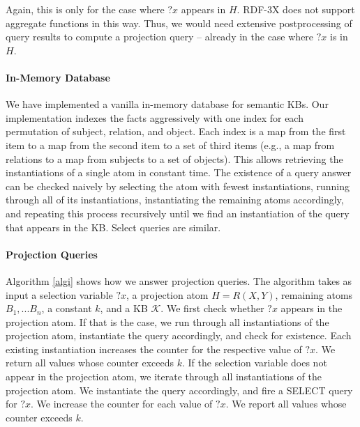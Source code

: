 Again, this is only for the case where $?x$ appears in $H$. RDF-3X does not support aggregate functions in this way. Thus, we would need extensive postprocessing of query results to compute a projection query -- already in the case where $?x$ is in $H$.

\paragraph{In-Memory Database} We have implemented a vanilla in-memory database for semantic KBs. Our implementation indexes the facts aggressively with one index for each permutation of subject, relation, and object. Each index is a map from the first item to a map from the second item to a set of third items (e.g., a map from relations to a map from subjects to a set of objects). This allows retrieving the instantiations of a single atom in constant time. The existence of a query answer can be checked naively by selecting the atom with fewest instantiations, running through all of its instantiations, instantiating the remaining atoms accordingly, and repeating this process recursively until we find an instantiation of the query that appears in the KB. Select queries are similar.

\paragraph{Projection Queries} Algorithm \ref{algi} shows how we answer projection queries. The algorithm takes as input a selection variable $?x$, a projection atom $H=R(X,Y)$, remaining atoms $B_1, ... B_n$, a constant $k$, and a KB $\mathcal{K}$.
We first check whether $?x$ appears in the projection atom. If that is the case, we run through all instantiations of the projection atom, instantiate the query accordingly, and check for existence. Each existing instantiation increases the counter for the respective value of $?x$. We return all values whose counter exceeds $k$. If the selection variable does not appear in the projection atom, we iterate through all instantiations of the projection atom. We instantiate the query accordingly, and fire a SELECT query for $?x$. We increase the counter for each value of $?x$. We report all values whose counter exceeds $k$.

